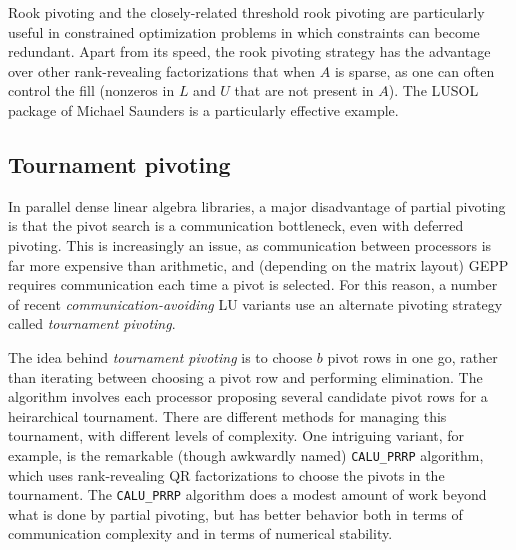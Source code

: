 Rook pivoting and the closely-related threshold rook pivoting are
particularly useful in constrained optimization problems in which
constraints can become redundant.  Apart from its speed, the rook
pivoting strategy has the advantage over other rank-revealing
factorizations that when $A$ is sparse, as one can often control the
fill (nonzeros in $L$ and $U$ that are not present in $A$).
The LUSOL package of Michael Saunders is a particularly effective example.

\subsection{Tournament pivoting}

In parallel dense linear algebra libraries,
a major disadvantage of partial pivoting is that the pivot search is
a communication bottleneck, even with deferred pivoting.  This is
increasingly an issue, as communication between processors is far
more expensive than arithmetic, and (depending on the matrix layout)
GEPP requires communication each time a pivot is selected.
For this reason, a number of recent {\em communication-avoiding}
LU variants use an alternate pivoting strategy called
{\em tournament pivoting}.

The idea behind {\em tournament pivoting} is to choose $b$ pivot rows in
one go, rather than iterating between choosing a pivot row and
performing elimination.  The algorithm involves each processor proposing
several candidate pivot rows for a heirarchical tournament.  There are
different methods for managing this tournament, with different levels of
complexity.  One intriguing variant, for example, is the remarkable
(though awkwardly named) {\tt CALU\_PRRP} algorithm, which uses
rank-revealing QR factorizations to choose the pivots in the tournament.
The {\tt CALU\_PRRP} algorithm does a modest amount of work beyond what
is done by partial pivoting, but has better behavior both in terms of
communication complexity and in terms of numerical stability.
